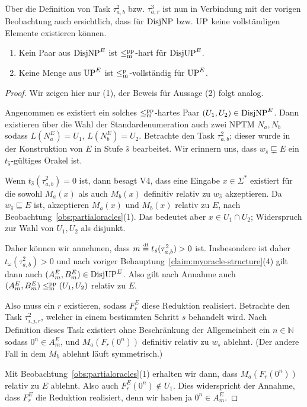 Über die Definition von Task $\tau^2_{a,b}$ bzw. $\tau^3_{a,r}$ ist nun in Verbindung mit der vorigen Beobachtung auch ersichtlich, dass für $\mathrm{DisjNP}$ bzw. $\mathrm{UP}$ keine vollständigen Elemente existieren können.

\begin{claim}\label{claim:myoracle-completness}
    \begin{enumerate}
        \item Kein Paar aus $\mathrm{DisjNP}^E$ ist $\leq_\mathrm{m}^\mathrm{pp}$-hart für $\mathrm{DisjUP}^E$.
        \item Keine Menge aus $\mathrm{UP}^E$ ist $\leq_\mathrm{m}^\mathrm{p}$-vollständig für $\mathrm{UP}^E$.
    \end{enumerate}
\end{claim}
\begin{proof}
    Wir zeigen hier nur (1), der Beweis für Aussage (2) folgt analog.

    Angenommen es existiert ein solches $\leq_\mathrm{m}^\mathrm{pp}$-hartes Paar $(U_1, U_2)\in\mathrm{DisjNP}^E$.
    Dann existieren über die Wahl der Standardenumeration auch zwei NPTM $N_a, N_b$ sodass $L(N_a^E)=U_1$, $L(N_b^E)=U_2$.
    Betrachte den Task $\tau^2_{a,b}$; dieser wurde in der Konstruktion von $E$ in Stufe $\hat{s}$ bearbeitet.
    Wir erinnern uns, dass $w_{\hat{s}}\sqsubsetneq E$ ein $t_{\hat{s}}$-gültiges Orakel ist.

    Wenn $t_{\hat{s}}(\tau^2_{a,b})=0$ ist, dann besagt V4, dass eine Eingabe $x\in\Sigma^*$ existiert für die sowohl $M_a(x)$ als auch $M_b(x)$ definitiv relativ zu $w_{\hat{s}}$ akzeptieren. Da $w_{\hat{s}}\sqsubseteq E$ ist, akzeptieren $M_a(x)$ und $M_b(x)$ relativ zu $E$, nach Beobachtung~\ref{obs:partialoracles}(1).
    Das bedeutet aber $x\in U_1\cap U_2$; Widerspruch zur Wahl von $U_1, U_2$ als disjunkt.

    Daher können wir annehmen, dass $m\stackrel{\text{{\normalfont\tiny df}}}{=}  t_{\hat{s}}(\tau^2_{a,b})>0$ ist.
    Insbesondere ist daher $t_\omega(\tau^2_{a,b})>0$ und nach voriger Behauptung~\ref{claim:myoracle-structure}(4) gilt dann auch $(A^E_m, B^E_m)\in\mathrm{DisjUP}^E$. Also gilt nach Annahme auch $(A^E_m, B^E_m) \leq_\mathrm{m}^\mathrm{pp} (U_1, U_2)$ relativ zu $E$.
    
    Also muss ein $r$ existieren, sodass $F_r^E$ diese Reduktion realisiert. Betrachte den Task  $\tau^2_{i,j,r}$, welcher in einem bestimmten Schritt $s$ behandelt wird.
    Nach Definition dieses Task existiert ohne Beschränkung der Allgemeinheit ein $n\in\mathbb N$ sodass $0^n\in A_m^E$, und $M_a(F_r(0^n))$ definitiv relativ zu $w_s$ ablehnt. (Der andere Fall in dem $M_b$ ablehnt läuft symmetrisch.)

    Mit Beobachtung~\ref{obs:partialoracles}(1) erhalten wir dann, dass $M_a(F_r(0^n))$ relativ zu $E$ ablehnt. Also auch $F^E_r(0^n)\not\in U_1$. Dies widerspricht der Annahme, dass $F_r^E$ die Reduktion realisiert, denn wir haben ja $0^n\in A_m^E$.
\end{proof}

